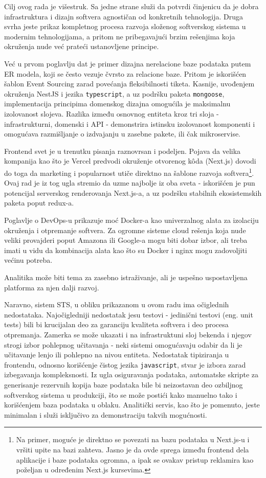 \documentclass[12pt,oneside]{memoir}
\begin{document}
Cilj ovog rada je višestruk. Sa jedne strane služi da potvrdi činjenicu da je dobra infrastruktura i dizajn softvera agnostičan od konkretnih tehnologija. Druga svrha jeste prikaz kompletnog procesa razvoja složenog softverskog sistema u modernim tehnologijama, a pritom ne pribegavajući brzim rešenjima koja okruženja nude već prateći ustanovljene principe.

Već u prvom poglavlju dat je primer dizajna nerelacione baze podataka putem ER modela, koji se često vezuje čvrsto za relacione baze. Pritom je iskorišćen šablon Event Sourcing zarad povećanja fleksibilnosti tiketa. Kasnije, uvođenjem okruženja NestJS i jezika \verb|typescript|, a uz podršku paketa \verb|mongoose|, implementacija principima domenskog dizajna omogućila je maksimalnu izolovanost slojeva. Razlika između osnovnog entiteta kroz tri sloja - infrastrukturni, domenski i API - demonstrira istinsku izolovanost komponenti i omogućava razmišljanje o izdvajanju u zasebne pakete, ili čak mikroservise.

Frontend svet je u trenutku pisanja raznovrsan i podeljen. Pojava da velika kompanija kao što je Vercel predvodi okruženje otvorenog k\^{o}da (Next.js) dovodi do toga da marketing i popularnost utiče direktno na šablone razvoja softvera\footnote{Na primer, moguće je direktno se povezati na bazu podataka u Next.js-u i vršiti upite na bazi zahteva. Jasno je da ovde sprega između frontend dela aplikacije i baze podataka ogromna, a ipak se ovakav pristup reklamira kao poželjan u određenim Next.js kursevima.}. Ovaj rad je iz tog ugla stremio da uzme najbolje iz oba sveta - iskorišćen je pun potencijal serverskog renderovanja Next.js-a, a uz podršku stabilnih ekosistemskih paketa poput redux-a.

Poglavlje o DevOps-u prikazuje moć Docker-a kao univerzalnog alata za izolaciju okruženja i otpremanje softvera. Za ogromne sisteme cloud rešenja koja nude veliki provajderi poput Amazona ili Google-a mogu biti dobar izbor, ali treba imati u vidu da kombinacija alata kao što su Docker i nginx mogu zadovoljiti većinu potreba.

Analitika može biti tema za zasebno istraživanje, ali je uspešno uspostavljena platforma za njen dalji razvoj.

Naravno, sistem STS, u obliku prikazanom u ovom radu ima očiglednih nedostataka. Najočigledniji nedostatak jesu testovi - jedinični testovi (eng. unit tests) bili bi krucijalan deo za garanciju kvaliteta softvera i deo procesa otpremanja. Zamerka se može ukazati i na infrastruktuni sloj bekenda i njegov strogi izbor pohlepnog učitavanja - neki sistemi omogućavaju odabir da li je učitavanje lenjo ili pohlepno na nivou entiteta. Nedostatak tipiziranja u frontendu, odnosno korišćenje čistog jezika \verb|javascript|, stvar je izbora zarad izbegavanja kompleksnosti. Iz ugla osiguravanja podataka, automatske skripte za generisanje rezervnih kopija baze podataka bile bi neizostavan deo ozbiljnog softverskog sistema u produkciji, što se može postići kako manuelno tako i korišćenjem baza podataka u oblaku. Analitički servis, kao što je pomenuto, jeste minimalan i služi isključivo za demonstraciju takvih mogućnosti.
\end{document}

